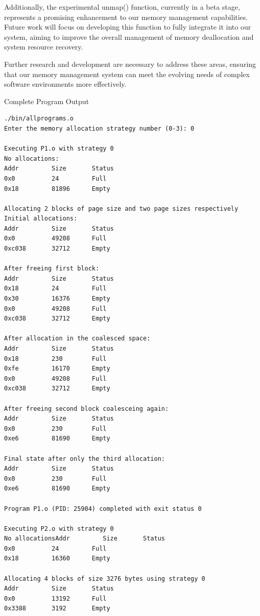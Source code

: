 \documentclass[conference]{IEEEtran}
\begin{document}
Additionally, the experimental unmap() function, currently in a beta stage, represents a promising enhancement to our memory management capabilities. Future work will focus on developing this function to fully integrate it into our system, aiming to improve the overall management of memory deallocation and system resource recovery.

Further research and development are necessary to address these areas, ensuring that our memory management system can meet the evolving needs of complex software environments more effectively.


\appendix
Complete Program Output
\label{app:output}
\begin{lstlisting}[label={lst:firstLst},caption={Complete Program Output}]
./bin/allprograms.o
Enter the memory allocation strategy number (0-3): 0

Executing P1.o with strategy 0
No allocations:
Addr         Size       Status
0x0          24         Full
0x18         81896      Empty

Allocating 2 blocks of page size and two page sizes respectively
Initial allocations:
Addr         Size       Status
0x0          49208      Full
0xc038       32712      Empty

After freeing first block:
Addr         Size       Status
0x18         24         Full
0x30         16376      Empty
0x0          49208      Full
0xc038       32712      Empty

After allocation in the coalesced space:
Addr         Size       Status
0x18         230        Full
0xfe         16170      Empty
0x0          49208      Full
0xc038       32712      Empty

After freeing second block coalesceing again:
Addr         Size       Status
0x0          230        Full
0xe6         81690      Empty

Final state after only the third allocation:
Addr         Size       Status
0x0          230        Full
0xe6         81690      Empty

Program P1.o (PID: 25904) completed with exit status 0

Executing P2.o with strategy 0
No allocationsAddr         Size       Status
0x0          24         Full
0x18         16360      Empty

Allocating 4 blocks of size 3276 bytes using strategy 0
Addr         Size       Status
0x0          13192      Full
0x3388       3192       Empty


\end{lstlisting}
\end{document}
